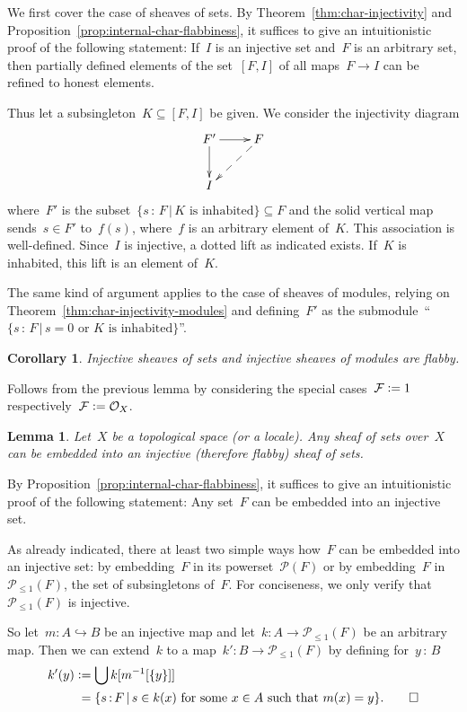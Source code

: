 \documentclass[10pt,reqno,a4paper]{amsbook}
\makeatletter
\theoremstyle{definition}
\theoremstyle{plain}
\newtheorem{cor}[defn]{Corollary}
\newtheorem{lemma}[defn]{Lemma}
\theoremstyle{remark}
\newcommand{\F}{\mathcal{F}}
\renewcommand{\O}{\mathcal{O}}
\renewcommand{\P}{\mathcal{P}}
\newcommand{\?}{\,{:}\,}
\renewcommand{\_}{\mathpunct{.}\,}
\newcommand{\defeq}{\vcentcolon=}
\renewenvironment{proof}[1][\proofname]{\par
  \pushQED{\qed}%
  \normalfont \topsep6\p@\@plus6\p@\relax
  \trivlist
  \item[\hskip\labelsep
        \itshape
    #1\@addpunct{.}]\ignorespaces
}{%
  \popQED\endtrivlist\@endpefalse
}
\makeatother
\begin{document}
\begin{proof}
We first cover the case of sheaves of sets. By Theorem~\ref{thm:char-injectivity}
and Proposition~\ref{prop:internal-char-flabbiness}, it suffices to give an
intuitionistic proof of the following statement: If~$I$ is an injective set
and~$F$ is an arbitrary set, then partially defined elements of the set~$[F,I]$
of all maps~$F \to I$ can be refined to honest elements.

Thus let a subsingleton~$K \subseteq [F,I]$ be given. We consider the
injectivity diagram
\[ \xymatrix{
  F' \ar[r]\ar[d] & F \ar@{-->}[ld] \\
  I
} \]
where~$F'$ is the subset~$\{ s \? F \,|\, \text{$K$ is inhabited} \} \subseteq F$ and the
solid vertical map sends~$s \in F'$ to~$f(s)$, where~$f$ is an arbitrary element
of~$K$. This association is well-defined. Since~$I$ is injective, a dotted lift
as indicated exists. If~$K$ is inhabited, this lift is an element of~$K$.

The same kind of argument applies to the case of sheaves of modules, relying on
Theorem~\ref{thm:char-injectivity-modules} and defining~$F'$ as the
submodule~``$\{ s \? F \,|\, \text{$s = 0$ or $K$ is inhabited} \}$''.
\end{proof}

\begin{cor}Injective sheaves of sets and injective sheaves of modules are
flabby.\end{cor}

\begin{proof}Follows from the previous lemma by considering the special cases~$\F
\defeq 1$ respectively~$\F \defeq \O_X$.\end{proof}

\begin{lemma}\label{lemma:enough-flabby}
Let~$X$ be a topological space (or a locale). Any sheaf of sets
over~$X$ can be embedded into an injective (therefore flabby) sheaf of sets.
\end{lemma}

\begin{proof}By Proposition~\ref{prop:internal-char-flabbiness}, it suffices to
give an intuitionistic proof of the following statement: Any set~$F$ can be
embedded into an injective set.

As already indicated, there at least two simple ways how~$F$ can be embedded
into an injective set: by embedding~$F$ in its powerset~$\P(F)$ or by
embedding~$F$ in~$\P_{\leq1}(F)$, the set of subsingletons of~$F$. For
conciseness, we only verify that~$\P_{\leq1}(F)$ is injective.

So let~$m : A \hookrightarrow B$ be an injective map and let~$k : A \to
\P_{\leq1}(F)$ be an arbitrary map. Then we can extend~$k$ to a map~$k' : B \to
\P_{\leq1}(F)$ by defining for~$y \? B$
\begin{align*}
  k'(y) &\defeq \bigcup k[m^{-1}[\{y\}]] \\
  &\phantom{\vcentcolon}= \{ s\?F \,|\, \text{$s \in k(x)$ for some~$x \in A$ such that~$m(x) = y$} \}.
  \qedhere
\end{align*}
\end{proof}
\end{document}

